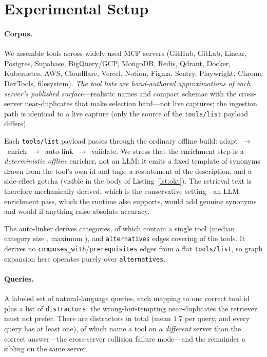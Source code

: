 \documentclass[11pt]{article}
\begin{document}
\section{Experimental Setup}
\label{sec:setup}

\paragraph{Corpus.} We assemble \numTools{} tools across \numServers{} widely
used MCP servers (GitHub, GitLab, Linear, Postgres, Supabase, BigQuery/GCP,
MongoDB, Redis, Qdrant, Docker, Kubernetes, AWS, Cloudflare, Vercel, Notion,
Figma, Sentry, Playwright, Chrome DevTools, filesystem). \emph{The tool lists are
hand-authored approximations of each server's published surface}---realistic
names and compact schemas with the cross-server near-duplicates that make
selection hard---not live captures; the ingestion path is identical to a live
capture (only the source of the \texttt{tools/list} payload differs).

Each \texttt{tools/list} payload passes through the ordinary offline build:
adapt~$\rightarrow$~enrich~$\rightarrow$~auto-link~$\rightarrow$~validate. We
stress that the enrichment step is a \emph{deterministic offline} enricher, not
an LLM: it emits a fixed template of synonyms drawn from the tool's own id and
tags, a restatement of the description, and a side-effect gotcha (visible in the
body of Listing~\ref{lst:okt}). The retrieval text is therefore mechanically
derived, which is the conservative setting---an LLM enrichment pass, which the
runtime also supports, would add genuine synonyms and would if anything raise
absolute accuracy.

The auto-linker derives \numCategories{} categories, of which
\numSingletonCategories{} contain a single tool (median category size
\medianCategorySize{}, maximum \maxCategorySize{}), and \numAltEdges{}
\texttt{alternatives} edges covering \numLinkedConcepts{} of the \numTools{}
tools. It derives no \texttt{composes\_with}/\texttt{prerequisites} edges from a
flat \texttt{tools/list}, so graph expansion here operates purely over
\texttt{alternatives}.

\paragraph{Queries.} A labeled set of \numQueries{} natural-language queries, each
mapping to one correct tool id plus a list of \texttt{distractors}: the
wrong-but-tempting near-duplicates the retriever must not prefer. There are
\numDistractors{} distractors in total (mean $1.7$ per query, and every query has
at least one), of which \numCrossServerDistractors{} name a tool on a
\emph{different} server than the correct answer---the cross-server collision
failure mode---and the remainder a sibling on the same server.
\end{document}
